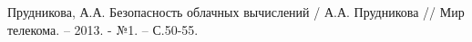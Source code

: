 \begingroup 
\renewcommand{\section}[2]{\anonsection{Библиографический список}}
\begin{thebibliography}{00}

    Прудникова, А.А.
    Безопасность облачных вычислений /
    А.А. Прудникова //
    Мир телекома. -- 2013. - №1.
    -- С.50-55.

\end{thebibliography}
\endgroup

\clearpage
